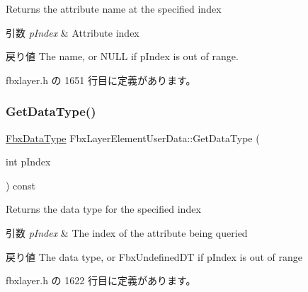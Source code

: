 Returns the attribute name at the specified index 
\begin{DoxyParams}{引数}
{\em p\+Index} & Attribute index \\
\hline
\end{DoxyParams}
\begin{DoxyReturn}{戻り値}
The name, or {\ttfamily N\+U\+LL} if p\+Index is out of range. 
\end{DoxyReturn}


 fbxlayer.\+h の 1651 行目に定義があります。

\mbox{\label{class_fbx_layer_element_user_data_ace571a6982892b8b200c660589d22847}} 
\subsubsection{\texorpdfstring{Get\+Data\+Type()}{GetDataType()}\hspace{0.1cm}{\footnotesize\ttfamily [1/2]}}
{\footnotesize\ttfamily \hyperlink{class_fbx_data_type}{Fbx\+Data\+Type} Fbx\+Layer\+Element\+User\+Data\+::\+Get\+Data\+Type (\begin{DoxyParamCaption}\item[{int}]{p\+Index }\end{DoxyParamCaption}) const\hspace{0.3cm}{\ttfamily [inline]}}

Returns the data type for the specified index 
\begin{DoxyParams}{引数}
{\em p\+Index} & The index of the attribute being queried \\
\hline
\end{DoxyParams}
\begin{DoxyReturn}{戻り値}
The data type, or Fbx\+Undefined\+DT if p\+Index is out of range 
\end{DoxyReturn}


 fbxlayer.\+h の 1622 行目に定義があります。

\mbox{\label{class_fbx_layer_element_user_data_ac1d9a921886ec4840fa7472f7fd72b28}} 
